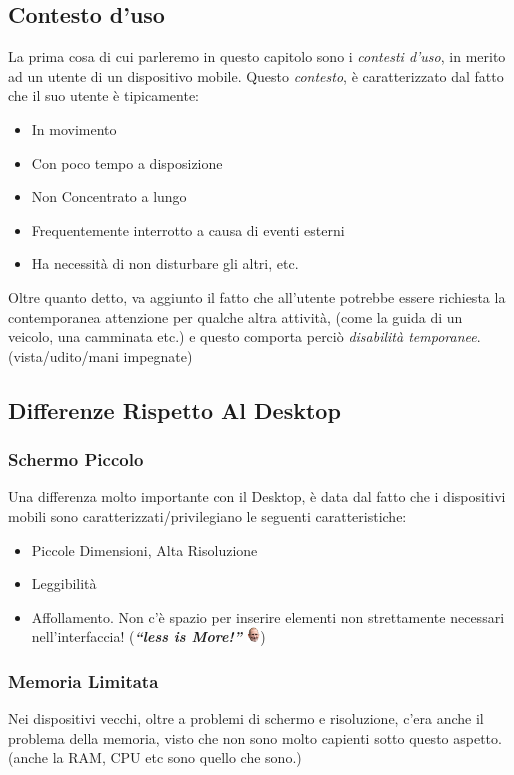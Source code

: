 \documentclass[oneside]{book}
\begin{document}
		\subsection{Contesto d'uso}
			La prima cosa di cui parleremo in questo capitolo sono i \emph{contesti d'uso}, in merito ad un utente di un dispositivo mobile. Questo \emph{contesto}, è caratterizzato dal fatto che il suo utente è tipicamente:
			\begin{itemize}
			\item In movimento
			\item Con poco tempo a disposizione
			\item Non Concentrato a lungo
			\item Frequentemente interrotto a causa di eventi esterni
			\item Ha necessità di non disturbare gli altri, etc.
			\end{itemize}
			Oltre quanto detto, va aggiunto il fatto che all'utente potrebbe essere richiesta la contemporanea attenzione per qualche altra attività, (come la guida di un veicolo, una camminata etc.) e questo comporta perciò \emph{disabilità temporanee}. (vista/udito/mani impegnate)

		\subsection{Differenze Rispetto Al Desktop}

			\subsubsection{Schermo Piccolo}
				Una differenza molto importante con il Desktop, è data dal fatto che i dispositivi mobili sono caratterizzati/privilegiano le seguenti caratteristiche:
				\begin{itemize}
				\item Piccole Dimensioni, Alta Risoluzione
				\item Leggibilità
				\item Affollamento. Non c'è spazio per inserire elementi non strettamente necessari nell'interfaccia! (\textbf{\emph{``less is More!''}} \includegraphics[height = 4mm]{images/jobs.png})
				\end{itemize}

			\subsubsection{Memoria Limitata}
				Nei dispositivi vecchi, oltre a problemi di schermo e risoluzione, c'era anche il problema della memoria, visto che non sono molto capienti sotto questo aspetto. (anche la RAM, CPU etc sono quello che sono.) \\
\end{document}
